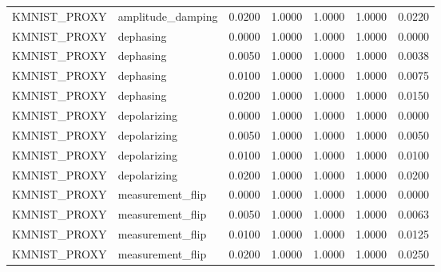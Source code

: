 \begin{tabular}{llrrrrr}
KMNIST\_PROXY & amplitude\_damping & 0.0200 & 1.0000 & 1.0000 & 1.0000 & 0.0220 \\
KMNIST\_PROXY & dephasing & 0.0000 & 1.0000 & 1.0000 & 1.0000 & 0.0000 \\
KMNIST\_PROXY & dephasing & 0.0050 & 1.0000 & 1.0000 & 1.0000 & 0.0038 \\
KMNIST\_PROXY & dephasing & 0.0100 & 1.0000 & 1.0000 & 1.0000 & 0.0075 \\
KMNIST\_PROXY & dephasing & 0.0200 & 1.0000 & 1.0000 & 1.0000 & 0.0150 \\
KMNIST\_PROXY & depolarizing & 0.0000 & 1.0000 & 1.0000 & 1.0000 & 0.0000 \\
KMNIST\_PROXY & depolarizing & 0.0050 & 1.0000 & 1.0000 & 1.0000 & 0.0050 \\
KMNIST\_PROXY & depolarizing & 0.0100 & 1.0000 & 1.0000 & 1.0000 & 0.0100 \\
KMNIST\_PROXY & depolarizing & 0.0200 & 1.0000 & 1.0000 & 1.0000 & 0.0200 \\
KMNIST\_PROXY & measurement\_flip & 0.0000 & 1.0000 & 1.0000 & 1.0000 & 0.0000 \\
KMNIST\_PROXY & measurement\_flip & 0.0050 & 1.0000 & 1.0000 & 1.0000 & 0.0063 \\
KMNIST\_PROXY & measurement\_flip & 0.0100 & 1.0000 & 1.0000 & 1.0000 & 0.0125 \\
KMNIST\_PROXY & measurement\_flip & 0.0200 & 1.0000 & 1.0000 & 1.0000 & 0.0250 \\
\bottomrule
\end{tabular}

